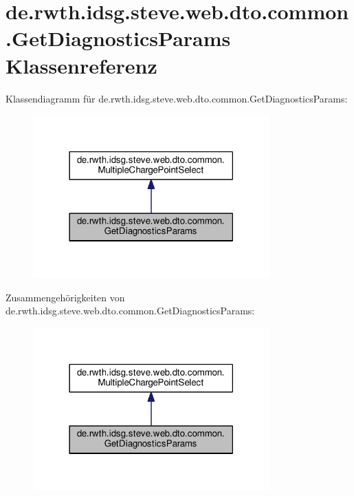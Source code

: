 \hypertarget{classde_1_1rwth_1_1idsg_1_1steve_1_1web_1_1dto_1_1common_1_1_get_diagnostics_params}{\section{de.\+rwth.\+idsg.\+steve.\+web.\+dto.\+common.\+Get\+Diagnostics\+Params Klassenreferenz}
\label{classde_1_1rwth_1_1idsg_1_1steve_1_1web_1_1dto_1_1common_1_1_get_diagnostics_params}
}


Klassendiagramm für de.\+rwth.\+idsg.\+steve.\+web.\+dto.\+common.\+Get\+Diagnostics\+Params\+:\nopagebreak
\begin{figure}[H]
\begin{center}
\leavevmode
\includegraphics[width=258pt]{classde_1_1rwth_1_1idsg_1_1steve_1_1web_1_1dto_1_1common_1_1_get_diagnostics_params__inherit__graph}
\end{center}
\end{figure}


Zusammengehörigkeiten von de.\+rwth.\+idsg.\+steve.\+web.\+dto.\+common.\+Get\+Diagnostics\+Params\+:\nopagebreak
\begin{figure}[H]
\begin{center}
\leavevmode
\includegraphics[width=258pt]{classde_1_1rwth_1_1idsg_1_1steve_1_1web_1_1dto_1_1common_1_1_get_diagnostics_params__coll__graph}
\end{center}
\end{figure}


